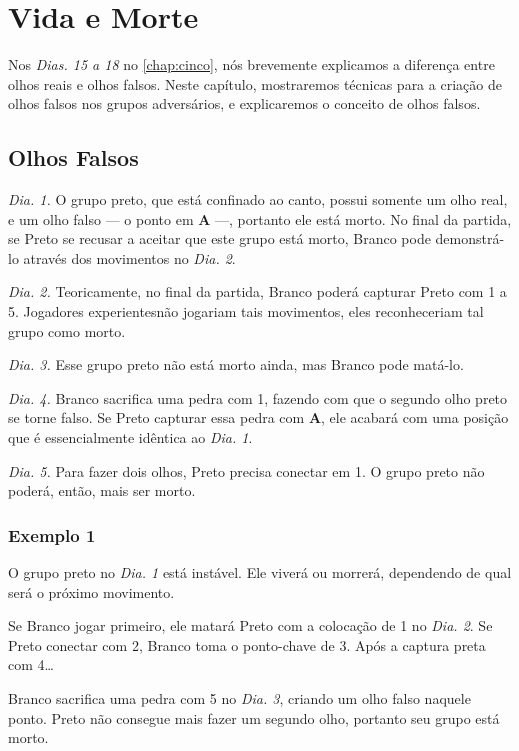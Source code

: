 \chapter{Vida e Morte}

Nos \emph{Dias. 15 a 18} no \autoref{chap:cinco}, nós brevemente explicamos a diferença entre olhos reais e olhos falsos. Neste capítulo, mostraremos técnicas para a criação de olhos falsos nos grupos adversários, e explicaremos o conceito de olhos falsos.

\section{Olhos Falsos}

\emph{Dia. 1.} O grupo preto, que está confinado ao canto, possui somente um olho real, e um olho falso --- o ponto em \textbf{A} ---, portanto ele está morto. No final da partida, se Preto se recusar a aceitar que este grupo está morto, Branco pode demonstrá-lo através dos movimentos no \emph{Dia. 2}.

\emph{Dia. 2.} Teoricamente, no final da partida, Branco poderá capturar Preto com 1 a 5. Jogadores experientesnão jogariam tais movimentos, eles reconheceriam tal grupo como morto.

\emph{Dia. 3.} Esse grupo preto não está morto ainda, mas Branco pode matá-lo.

\emph{Dia. 4.} Branco sacrifica uma pedra com 1, fazendo com que o segundo olho preto se torne falso. Se Preto capturar essa pedra com \textbf{A}, ele acabará com uma posição que é essencialmente idêntica ao \emph{Dia. 1}.

\emph{Dia. 5.} Para fazer dois olhos, Preto precisa conectar em 1. O grupo preto não poderá, então, mais ser morto.

\subsection{Exemplo 1}

O grupo preto no \emph{Dia. 1} está instável. Ele viverá ou morrerá, dependendo de qual será o próximo movimento.

Se Branco jogar primeiro, ele matará Preto com a colocação de 1 no \emph{Dia. 2}. Se Preto conectar com 2, Branco toma o ponto-chave de 3. Após a captura preta com 4\ldots

Branco sacrifica uma pedra com 5 no \emph{Dia. 3}, criando um olho falso naquele ponto. Preto não consegue mais fazer um segundo olho, portanto seu grupo está morto.

